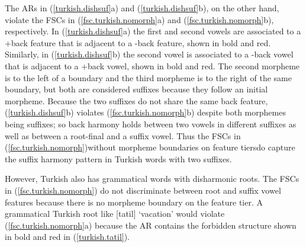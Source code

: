 \documentclass[,doc,floatsintext]{apa6}
\theoremstyle{definition}
\theoremstyle{definition}
\theoremstyle{definition}
\theoremstyle{remark}
\begin{document}
The ARs in (\ref{turkish.dishsuf}a) and (\ref{turkish.dishsuf}b), on the
other hand, violate the FSCs in (\ref{fsc.turkish.nomorph}a) and
(\ref{fsc.turkish.nomorph}b), respectively. In (\ref{turkish.dishsuf}a)
the first and second vowels are associated to a +back feature that is
adjacent to a -back feature, shown in bold and red. Similarly, in
(\ref{turkish.dishsuf}b) the second vowel is associated to a -back vowel
that is adjacent to a +back vowel, shown in bold and red. The second
morpheme is to the left of a boundary and the third morpheme is to the
right of the same boundary, but both are considered suffixes because
they follow an initial morpheme. Because the two suffixes do not share
the same back feature, (\ref{turkish.dishsuf}b) violates
(\ref{fsc.turkish.nomorph}b) despite both morphemes being suffixes; so
back harmony holds between two vowels in different suffixes as well as
between a root-final and a suffix vowel. Thus the FSCs in
(\ref{fsc.turkish.nomorph})\textemdash without morpheme boundaries on
feature tiers\textemdash do capture the suffix harmony pattern in
Turkish words with two suffixes.

However, Turkish also has grammatical words with disharmonic roots. The
FSCs in (\ref{fsc.turkish.nomorph}) do not discriminate between root and
suffix vowel features because there is no morpheme boundary on the
feature tier. A grammatical Turkish root like {[}tatil{]} `vacation'
would violate (\ref{fsc.turkish.nomorph}a) because the AR contains the
forbidden structure shown in bold and red in (\ref{turkish.tatil}).

\begin{exe}
 \label{turkish.tatil} \\
\end{exe}
\end{document}
